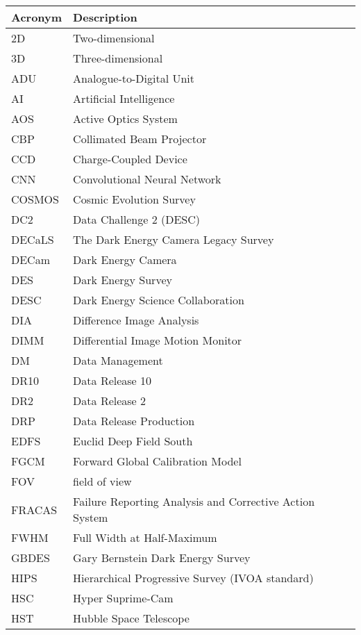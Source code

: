 \addtocounter{table}{-1}
\begin{longtable}{p{}p{}}\hline
\textbf{Acronym} & \textbf{Description}  \\\hline

2D & Two-dimensional \\\hline
3D & Three-dimensional \\\hline
ADU & Analogue-to-Digital Unit \\\hline
AI & Artificial Intelligence \\\hline
AOS & Active Optics System \\\hline
CBP & Collimated Beam Projector \\\hline
CCD & Charge-Coupled Device \\\hline
CNN & Convolutional Neural Network \\\hline
COSMOS & Cosmic Evolution Survey \\\hline
DC2 & Data Challenge 2 (DESC) \\\hline
DECaLS & The Dark Energy Camera Legacy Survey \\\hline
DECam & Dark Energy Camera \\\hline
DES & Dark Energy Survey \\\hline
DESC & Dark Energy Science Collaboration \\\hline
DIA & Difference Image Analysis \\\hline
DIMM & Differential Image Motion Monitor \\\hline
DM & Data Management \\\hline
DR10 & Data Release 10 \\\hline
DR2 & Data Release 2 \\\hline
DRP & Data Release Production \\\hline
EDFS & Euclid Deep Field South \\\hline
FGCM & Forward Global Calibration Model \\\hline
FOV & field of view \\\hline
FRACAS & Failure Reporting Analysis and Corrective Action System \\\hline
FWHM & Full Width at Half-Maximum \\\hline
GBDES & Gary Bernstein Dark Energy Survey \\\hline
HIPS & Hierarchical Progressive Survey (IVOA standard) \\\hline
HSC & Hyper Suprime-Cam \\\hline
HST & Hubble Space Telescope \\\hline

\end{longtable}
